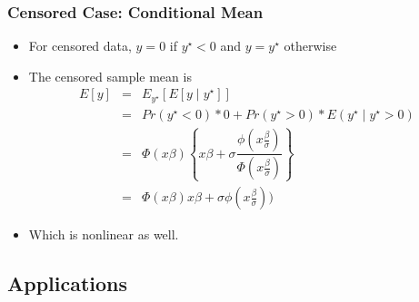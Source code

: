 \documentclass{beamer}
\newcommand{\1}{\mathbb{1}}
\begin{document}
\begin{frame}\frametitle{Censored Case: Conditional Mean}
\begin{itemize}
\item For censored data, $y=0$ if $y^{\star}<0$ and $y=y^{\star}$ otherwise
\item The censored sample mean is 
\begin{eqnarray*}
E[y] &=& E_{y^{\star}}[E[y\mid y^{\star}]] \\
     &=& Pr(y^{\star} <0) * 0 + Pr(y^{\star} >0) * E(y^{\star} \mid y^{\star}>0)\\
     &=& \Phi(x\beta) \left\lbrace x\beta + \sigma \dfrac{\phi(x\tfrac{\beta}{\sigma})}{\Phi(x\tfrac{\beta}{\sigma})} \right\rbrace \\
     &=& \Phi(x\beta) x\beta + \sigma \phi(x\tfrac{\beta}{\sigma}))
\end{eqnarray*}
\item Which is nonlinear as well.
\end{itemize}
\end{frame}

\begin{frame}\frametitle{}
\end{frame}

\begin{frame}\frametitle{}
\end{frame}

\begin{frame}\frametitle{}
\end{frame}

\begin{frame}\frametitle{}
\end{frame}

\begin{frame}\frametitle{}
\end{frame}


\begin{frame}
\tableofcontents[currentsection] 
\end{frame}


\subsection{Applications}

\begin{frame}
\end{frame}
\end{document}
